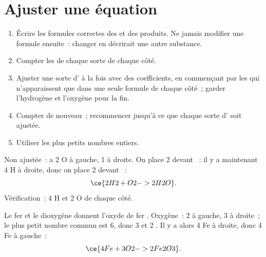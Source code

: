 \section{Ajuster une équation}

\begin{method}\label{met:g8:balanced-equations:balance}
\begin{enumerate}
  \item Écrire les formules correctes des  et des produits. Ne
        jamais modifier une formule ensuite~: changer  en
         décrirait une autre substance.
  \item Compter les  de chaque sorte de chaque côté.
  \item Ajuster une sorte d' à la fois avec des coefficients, en
        commençant par les  qui n'apparaissent que dans une seule
        formule de chaque côté~; garder l'hydrogène et l'oxygène pour la
        fin.
  \item Compter de nouveau~; recommencer jusqu'à ce que chaque sorte
        d' soit ajustée.
  \item Utiliser les plus petits nombres entiers.
\end{enumerate}
\end{method}

\begin{example}\label{ex:g8:balanced-equations:water}
Non ajustée~:  %
a 2 O à gauche, 1 à droite. On place 2 devant ~: il y a
maintenant 4 H à droite, donc on place 2 devant ~:
\[
  \ce{2H2 + O2 -> 2H2O}.
\]
Vérification~: 4 H et 2 O de chaque côté.
\end{example}

\begin{example}\label{ex:g8:balanced-equations:iron-oxide}
Le fer et le dioxygène donnent l'oxyde de fer . Oxygène~: 2 à
gauche, 3 à droite~; le plus petit nombre commun est 6, donc 3 
et 2 . Il y a alors 4 Fe à droite, donc 4 Fe à gauche~:
\[
  \ce{4Fe + 3O2 -> 2Fe2O3}.
\]
\end{example}

